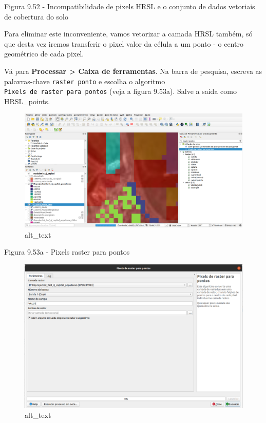 \documentclass[
  portuguese,
]{krantz}
\begin{document}
Figura 9.52 - Incompatibilidade de pixels HRSL e o conjunto de dados vetoriais de cobertura do solo

Para eliminar este inconveniente, vamos vetorizar a camada HRSL também, só que desta vez iremos transferir o pixel valor da célula a um ponto - o centro geométrico de cada pixel.

Vá para \textbf{Processar \textgreater{} Caixa de ferramentas}. Na barra de pesquisa, escreva as palavras-chave \texttt{raster\ ponto} e escolha o algoritmo \texttt{Pixels\ de\ raster\ para\ pontos} (veja a figura 9.53a). Salve a saída como HRSL\_points.

\begin{figure}
\centering
\includegraphics{media/modulo9/fig953_a.png}
\caption{alt\_text}
\end{figure}

Figura 9.53a - Pixels raster para pontos

\begin{figure}
\centering
\includegraphics{media/modulo9/fig953_b.png}
\caption{alt\_text}
\end{figure}
\end{document}
